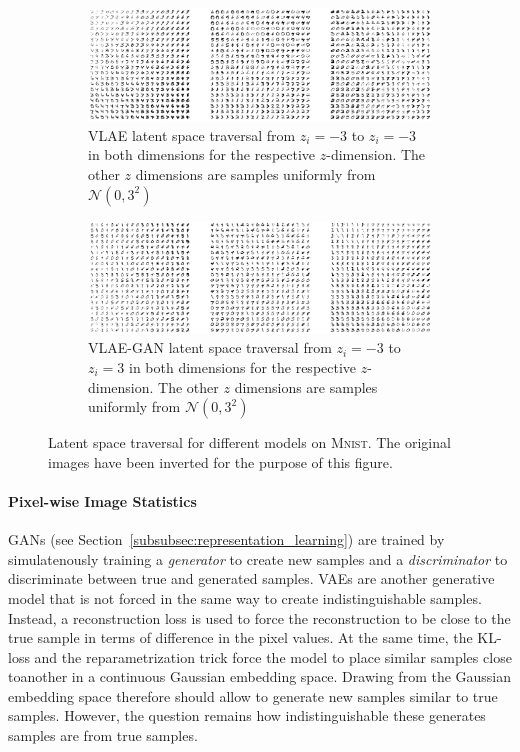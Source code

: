 \begin{figure}
    \ContinuedFloat
    \centering
    \begin{subfigure}{\textwidth}
        \centering
        \includegraphics[width=\textwidth]{images/latent_space_traversals/vlae_mnist.png}
        \caption{\ac{VLAE} latent space traversal from $z_i=-3$ to $z_i=-3$ in both dimensions for the respective $z$-dimension. The other $z$ dimensions are samples uniformly from $\mathcal{N}(0, 3^2)$}
    \end{subfigure}
    \begin{subfigure}{\textwidth}
        \centering
        \includegraphics[width=\textwidth]{images/latent_space_traversals/vlae_gan_mnist.png}
        \caption{\ac{VLAE}-\ac{GAN} latent space traversal from $z_i=-3$ to $z_i=3$ in both dimensions for the respective $z$-dimension. The other $z$ dimensions are samples uniformly from $\mathcal{N}(0, 3^2)$}
    \end{subfigure}
    \caption{Latent space traversal for different models on \textsc{Mnist}. The original images have been inverted for the purpose of this figure.}
    \label{fig:mnist_latent_space_traversal}
\end{figure}

\paragraph{Pixel-wise Image Statistics}

\acp{GAN} (see Section~\ref{subsubsec:representation_learning}) are trained by simulatenously training a \textit{generator} to create new samples and a \textit{discriminator} to discriminate between true and generated samples.
\acp{VAE} are another generative model that is not forced in the same way to create indistinguishable samples.
Instead, a reconstruction loss is used to force the reconstruction to be close to the true sample in terms of difference in the pixel values.
At the same time, the \ac{KL}-loss and the reparametrization trick force the model to place similar samples close toanother in a continuous Gaussian embedding space.
Drawing from the Gaussian embedding space therefore should allow to generate new samples similar to true samples.
However, the question remains how indistinguishable these generates samples are from true samples.

